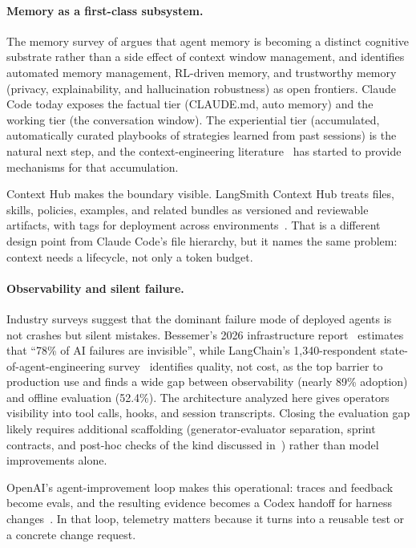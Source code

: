 \paragraph{Memory as a first-class subsystem.}
The memory survey of \citet{hu2025memory} argues that agent memory is becoming a distinct cognitive substrate rather than a side effect of context window management, and identifies automated memory management, RL-driven memory, and trustworthy memory (privacy, explainability, and hallucination robustness) as open frontiers. Claude Code today exposes the factual tier (CLAUDE.md, auto memory) and the working tier (the conversation window). The experiential tier (accumulated, automatically curated playbooks of strategies learned from past sessions) is the natural next step, and the context-engineering literature~\citep{zhang2026ace} has started to provide mechanisms for that accumulation.

Context Hub makes the boundary visible. LangSmith Context Hub treats  files, skills, policies, examples, and related bundles as versioned and reviewable artifacts, with tags for deployment across environments~\citep{langchain2026contexthub}. That is a different design point from Claude Code's file hierarchy, but it names the same problem: context needs a lifecycle, not only a token budget.

\paragraph{Observability and silent failure.}
Industry surveys suggest that the dominant failure mode of deployed agents is not crashes but silent mistakes. Bessemer's 2026 infrastructure report~\citep{bessemer2026infra} estimates that ``78\% of AI failures are invisible'', while LangChain's 1{,}340-respondent state-of-agent-engineering survey~\citep{langchain2026state} identifies quality, not cost, as the top barrier to production use and finds a wide gap between observability (nearly 89\% adoption) and offline evaluation (52.4\%). The architecture analyzed here gives operators visibility into tool calls, hooks, and session transcripts. Closing the evaluation gap likely requires additional scaffolding (generator-evaluator separation, sprint contracts, and post-hoc checks of the kind discussed in~\citet{anthropic2026harness}) rather than model improvements alone.

OpenAI's agent-improvement loop makes this operational: traces and feedback become evals, and the resulting evidence becomes a Codex handoff for harness changes~\citep{openai2026agentimprovementloop}. In that loop, telemetry matters because it turns into a reusable test or a concrete change request.

